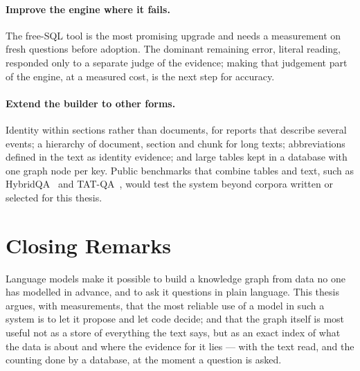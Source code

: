 \paragraph{Improve the engine where it fails.} The free-SQL tool is the most promising upgrade and needs a measurement
on fresh questions before adoption. The dominant remaining error, literal reading, responded only to a separate judge
of the evidence; making that judgement part of the engine, at a measured cost, is the next step for accuracy.

\paragraph{Extend the builder to other forms.} Identity within sections rather than documents, for reports that
describe several events; a hierarchy of document, section and chunk for long texts; abbreviations defined in the text
as identity evidence; and large tables kept in a database with one graph node per key. Public benchmarks that combine
tables and text, such as HybridQA~\cite{chen2020hybridqa} and TAT-QA~\cite{zhu2021tatqa}, would test the system beyond
corpora written or selected for this thesis.

\section{Closing Remarks}\label{sec:ch09-closing}

Language models make it possible to build a knowledge graph from data no one has modelled in advance, and to ask it
questions in plain language. This thesis argues, with measurements, that the most reliable use of a model in such a
system is to let it propose and let code decide; and that the graph itself is most useful not as a store of everything
the text says, but as an exact index of what the data is about and where the evidence for it lies --- with the text
read, and the counting done by a database, at the moment a question is asked.
